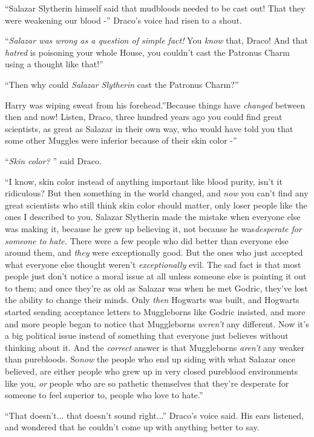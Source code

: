 ``Salazar Slytherin himself said that mudbloods needed to be cast out!
That they were weakening our blood -'' Draco's voice had risen to a
shout.

``\emph{Salazar was wrong as a question of simple fact!} You \emph{know}
that, Draco! And that \emph{hatred} is poisoning your whole House, you
couldn't cast the Patronus Charm using a thought like that!''

``Then why could \emph{Salazar Slytherin} cast the Patronus Charm?''

Harry was wiping sweat from his forehead.''Because things have
\emph{changed} between then and now! Listen, Draco, three hundred years
ago you could find great scientists, as great as Salazar in their own
way, who would have told you that some other Muggles were inferior
because of their skin color -''

``\emph{Skin color?} '' said Draco.

``I know, skin color instead of anything important like blood purity,
isn't it ridiculous? But then something in the world changed, and
\emph{now} you can't find any great scientists who still think skin
color should matter, only loser people like the ones I described to you.
Salazar Slytherin made the mistake when everyone else was making it,
because he grew up believing it, not because he was\emph{desperate for
someone to hate.} There were a few people who did better than everyone
else around them, and \emph{they} were exceptionally good. But the ones
who just accepted what everyone else thought weren't
\emph{exceptionally} evil. The sad fact is that most people just don't
notice a moral issue at all unless someone else is pointing it out to
them; and once they're as old as Salazar was when he met Godric, they've
lost the ability to change their minds. Only \emph{then} Hogwarts was
built, and Hogwarts started sending acceptance letters to Muggleborns
like Godric insisted, and more and more people began to notice that
Muggleborns \emph{weren't} any different. Now it's a big political issue
instead of something that everyone just believes without thinking about
it. And the \emph{correct} answer is that Muggleborns \emph{aren't} any
weaker than purebloods. So\emph{now} the people who end up siding with
what Salazar once believed, are either people who grew up in very closed
pureblood environments like you, \emph{or} people who are so pathetic
themselves that they're desperate for someone to feel superior to,
people who love to hate.''

``That doesn't... that doesn't sound right...'' Draco's voice
said. His ears listened, and wondered that he couldn't come up with
anything better to say.

